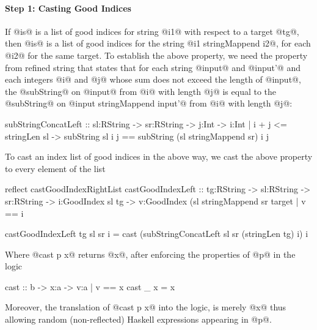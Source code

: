 \paragraph{Step 1: Casting Good Indices}
If @is@ is a list of good indices for string @i1@ with respect to a target @tg@,
then @is@ is a list of good indices for the string @i1 stringMappend i2@, for each @i2@
for the same target.
%
To establish the above property,
we need the property from refined string
that states that
for each string @input@ and @input'@
and each integers @i@ and @j@ whose sum does not exceed the length of @input@,
the @subString@ on @input@ from @i@ with length @j@
is equal to
the @subString@ on @input stringMappend input'@ from @i@ with length @j@:
%
\begin{code}
subStringConcatLeft
    :: sl:RString -> sr:RString -> j:Int
    ->  i:{Int | i + j <= stringLen sl }
    ->  { subString sl i j == subString (sl stringMappend sr) i j }
\end{code}
%
To cast an index list of good indices in the above way,
we cast the above property to every element of the list
%
\begin{code}
reflect castGoodIndexRightList
castGoodIndexLeft
  :: tg:RString -> sl:RString -> sr:RString
  -> i:GoodIndex sl tg
  -> {v:GoodIndex (sl stringMappend sr target | v == i}

castGoodIndexLeft tg sl sr i
  = cast (subStringConcatLeft sl sr (stringLen tg) i) i
\end{code}
%
Where @cast p x@
returns @x@, after enforcing the properties of @p@ in the logic
\begin{code}
cast :: b -> x:a -> {v:a | v == x }
cast _ x = x
\end{code}
%
Moreover, the translation of @cast p x@ into the logic, is merely @x@
thus allowing random (\ie non-reflected) Haskell expressions appearing in @p@.

